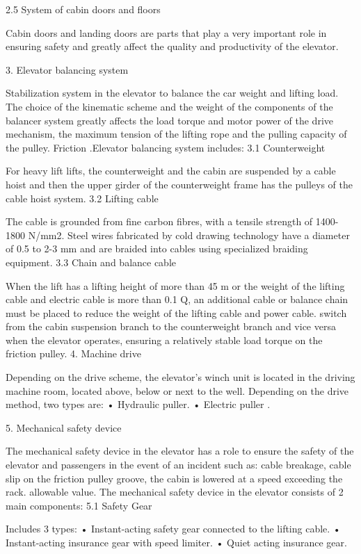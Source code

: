2.5 System of cabin doors and floors

Cabin doors and landing doors are parts that play a very important role in ensuring safety and greatly affect the quality and productivity of the elevator.

3. Elevator balancing system

Stabilization system in the elevator to balance the car weight and lifting load. The choice of the kinematic scheme and the weight of the components of the balancer system greatly affects the load torque and motor power of the drive mechanism, the maximum tension of the lifting rope and the pulling capacity of the pulley. Friction .Elevator balancing system includes:
3.1  Counterweight

For heavy lift lifts, the counterweight and the cabin are suspended by a cable hoist and then the upper girder of the counterweight frame has the pulleys of the cable hoist system.
3.2  Lifting cable

The cable is grounded from fine carbon fibres, with a tensile strength of 1400-1800 N/mm2. Steel wires fabricated by cold drawing technology have a diameter of 0.5 to 2-3 mm and are braided into cables using specialized braiding equipment.
3.3  Chain and balance cable

When the lift has a lifting height of more than 45 m or the weight of the lifting cable and electric cable is more than 0.1 Q, an additional cable or balance chain must be placed to reduce the weight of the lifting cable and power cable. switch from the cabin suspension branch to the counterweight branch and vice versa when the elevator operates, ensuring a relatively stable load torque on the friction pulley.
4.  Machine drive

Depending on the drive scheme, the elevator's winch unit is located in the driving machine room, located above, below or next to the well.
Depending on the drive method, two types are:
•	Hydraulic puller.
•	Electric puller . 

5.  Mechanical safety device

The mechanical safety device in the elevator has a role to ensure the safety of the elevator and passengers in the event of an incident such as: cable breakage, cable slip on the friction pulley groove, the cabin is lowered at a speed exceeding the rack. allowable value. The mechanical safety device in the elevator consists of 2 main components:
5.1  Safety Gear

Includes 3 types:
•	Instant-acting safety gear connected to the lifting cable.
•	Instant-acting insurance gear with speed limiter.
•	Quiet acting insurance gear.


